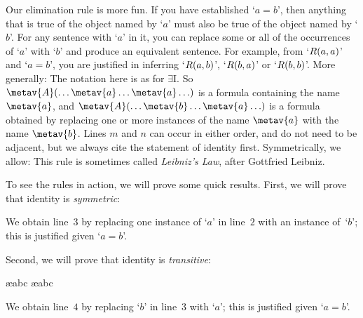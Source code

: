 Our elimination rule is more fun. If you have established `$a=b$', then anything that is true of the object named by `$a$' must also be true of the object named by `$b$'. For any sentence with `$a$' in it, you can replace some or all of the occurrences of `$a$' with `$b$' and produce an equivalent sentence. For example, from `$R(a,a)$' and `$a = b$', you are justified in inferring `$R(a,b)$', `$R(b,a)$' or `$R(b,b)$'. More generally:
The notation here is as for $\exists$I. So $\metav{A}(\ldots \metav{a} \ldots \metav{a}\ldots)$ is a formula containing the name $\metav{a}$, and $\metav{A}(\ldots \metav{b} \ldots \metav{a}\ldots)$ is a formula obtained by replacing one or more instances of the name $\metav{a}$ with the name $\metav{b}$. Lines $m$ and $n$ can occur in either order, and do not need to be adjacent, but we always cite the statement of identity first. Symmetrically, we allow:
This rule is sometimes called \emph{Leibniz's Law}, after Gottfried Leibniz.

To see the rules in action, we will prove some quick results. First, we will prove that identity is \emph{symmetric}:
\begin{fitchproof}
	\open
		\AS
	\close
\end{fitchproof}
We obtain line~$3$ by replacing one instance of `$a$' in line~$2$ with an instance of~`$b$'; this is justified given `$a= b$'.

Second, we will prove that identity is \emph{transitive}:
\begin{fitchproof}
	\open
		\AS
		\ae{abc}
		\ae{abc}
	\close
\end{fitchproof}
We obtain line~$4$ by replacing `$b$' in line~$3$ with `$a$'; this is justified given `$a= b$'.

